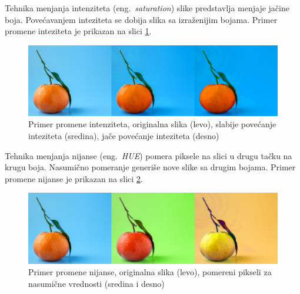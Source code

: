 \documentclass[12pt,oneside]{memoir}
\begin{document}
Tehnika menjanja intenziteta (eng.~\textit{saturation}) slike predstavlja menjaje jačine boja. Povećavanjem inteziteta se dobija slika sa izraženijim bojama. Primer promene inteziteta je prikazan na slici \ref{fig:section3_saturation}.

\begin{figure}[ht]
    \centering
    \includegraphics[width=1\textwidth]{matfmaster/glava3/saturation.jpg}
    \caption{Primer promene intenziteta, originalna slika (levo), slabije povećanje inteziteta (sredina), jače povećanje inteziteta (desno) \cite{unsplashOrange}} 
    \label{fig:section3_saturation}
\end{figure}

Tehnika menjanja nijanse (eng.~\textit{HUE}) pomera piksele na slici u drugu tačku na krugu boja. Nasumično pomeranje generiše nove slike sa drugim bojama. Primer promene nijanse je prikazan na slici \ref{fig:section3_hue}.


\begin{figure}[ht]
    \centering
    \includegraphics[width=1\textwidth]{matfmaster/glava3/hue.jpg}
    \caption{Primer promene nijanse, originalna slika (levo), pomereni pikseli za nasumične vrednosti (sredina i desno) \cite{unsplashOrange}} 
    \label{fig:section3_hue}
\end{figure}

\end{document}
